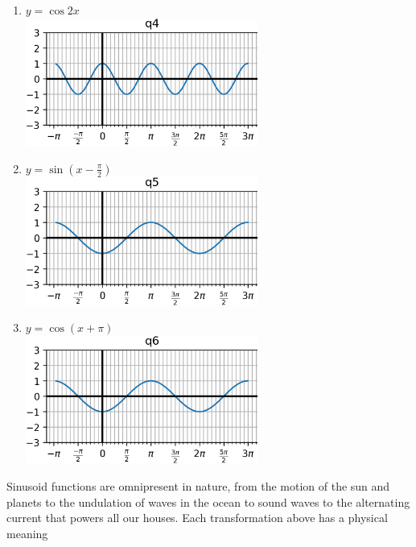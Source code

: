 \documentclass{article}
\begin{document}
\begin{multicols}{2}
\begin{enumerate}
	\item $y=\cos 2x$ \\
	\includegraphics*[width=3in]{q4.png}
	\item $y=\sin(x-\frac{\pi}{2})$ \\
	\includegraphics*[width=3in]{q5.png}
	\item $y=\cos(x+\pi)$ \\
	\includegraphics*[width=3in]{q6.png}
\end{enumerate}

Sinusoid functions are omnipresent in nature, from the motion of the
sun and planets to the undulation of waves in the ocean to sound waves
to the alternating current that powers all our houses. Each transformation above has a physical meaning


\end{multicols}
\end{document}

